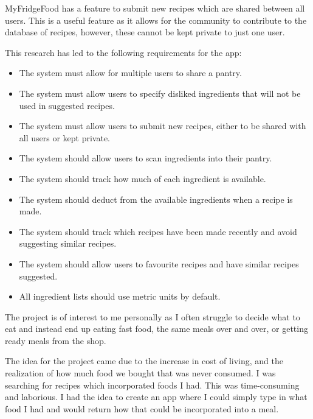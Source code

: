 \documentclass[../CHEFCookingHelperForEveryonesFridge.tex]{subfiles}
\begin{document}
MyFridgeFood has a feature to submit new recipes which are shared between all users. This is a useful feature as it allows for the community to contribute to the database
of recipes, however, these cannot be kept private to just one user.

This research has led to the following requirements for the \chef{} app:
\begin{itemize}
    \item The system must allow for multiple users to share a pantry.
    \item The system must allow users to specify disliked ingredients that will not be used in suggested recipes.
    \item The system must allow users to submit new recipes, either to be shared with all users or kept private.
    \item The system should allow users to scan ingredients into their pantry.
    \item The system should track how much of each ingredient is available.
    \item The system should deduct from the available ingredients when a recipe is made.
    \item The system should track which recipes have been made recently and avoid suggesting similar recipes.
    \item The system should allow users to favourite recipes and have similar recipes suggested.
    \item All ingredient lists should use metric units by default.
\end{itemize}
The project is of interest to me personally as I often struggle to decide what to eat and instead end up eating fast food,
the same meals over and over, or getting ready meals from the shop.

The idea for the project came due to the increase in cost of living, and the realization of how much food we bought that was
never consumed. I was searching for recipes which incorporated foods I had. This was time-consuming and laborious.
I had the idea to create an app where I could simply type in what food I had and would return how that could be incorporated
into a meal.
\end{document}
